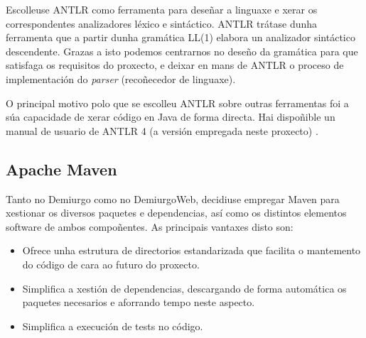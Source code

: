 \par
Escolleuse ANTLR\cite{antlr4} como ferramenta para deseñar a linguaxe e xerar os
correspondentes analizadores léxico e sintáctico. ANTLR trátase dunha ferramenta
que a partir dunha gramática LL(1) elabora un analizador sintáctico descendente.
Grazas a isto podemos centrarnos no deseño da gramática para que satisfaga os
requisitos do proxecto, e deixar en mans de ANTLR o proceso de implementación
do \textit{parser} (recoñecedor de linguaxe).
\par
O principal motivo polo que se escolleu ANTLR sobre outras ferramentas foi a súa
capacidade de xerar código en Java de forma directa. Hai dispoñible un manual de
usuario de ANTLR 4 (a versión empregada neste proxecto) \cite{antlr4}.

\subsection{Apache Maven}
Tanto no Demiurgo como no DemiurgoWeb, decidiuse empregar Maven\cite{maven} para
xestionar os diversos paquetes e dependencias, así como os distintos elementos
software de ambos compoñentes.
As principais vantaxes disto son:
\begin{itemize}
  \item Ofrece unha estrutura de directorios estandarizada que facilita o
  mantemento do código de cara ao futuro do proxecto.
  \item Simplifica a xestión de dependencias, descargando de forma automática os
  paquetes necesarios e aforrando tempo neste aspecto.
  \item Simplifica a execución de tests no código.
\end{itemize}


